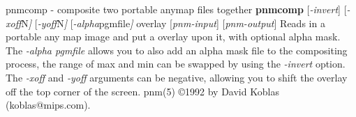 pnmcomp - composite two portable anymap files together
{\bf pnmcomp}
{\rm [}{\it -invert}{\rm ]}
{\rm [}{\it -xoff}{\rm N}{\it ]}
{\rm [}{\it -yoff}{\rm N}{\it ]}
{\rm [}{\it -alpha}{\rm pgmfile}{\it ]}
{\rm overlay}
{\rm [}{\it pnm-input}{\rm ]}
{\rm [}{\it pnm-output}{\rm ]}
Reads in a portable any map image and put a overlay upon it, with optional
alpha mask.  The 
{\it -alpha pgmfile}
allows you to also add an alpha mask file to the compositing process, the
range of max and min can be swapped by using the
{\it -invert}
option.
The
{\it -xoff}
and
{\it -yoff}
arguments can be negative, allowing you to shift the overlay off the
top corner of the screen.
pnm(5)
\copyright 1992 by David Koblas (koblas@mips.com).
%
 
%

\newpage
%

